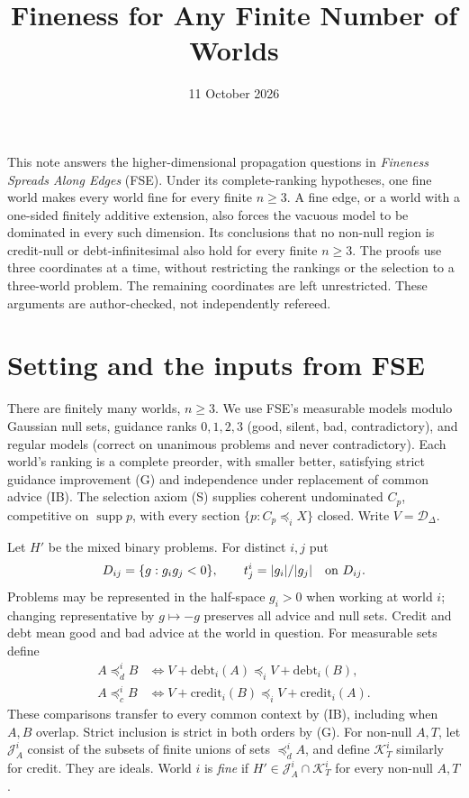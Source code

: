 \documentclass[11pt]{article}
\title{Fineness for Any Finite Number of Worlds}
\author{}\date{11 October 2026}
\theoremstyle{remark}\newtheorem{remark}[theorem]{Remark}
\newcommand{\Dscr}{\mathcal D}
\newcommand{\cred}{\mathrm{credit}}
\newcommand{\debt}{\mathrm{debt}}
\newcommand{\J}{\mathcal J}
\newcommand{\K}{\mathcal K}
\begin{document}
\maketitle

\noindent
This note answers the higher-dimensional propagation questions in
\emph{Fineness Spreads Along Edges} (FSE). Under its complete-ranking
hypotheses, one fine world makes every world fine for every finite
$n\ge3$. A fine edge, or a world with a one-sided finitely additive
extension, also forces the vacuous model to be dominated in every such
dimension. Its conclusions that no non-null region is credit-null or
debt-infinitesimal also hold for every finite $n\ge3$.
The proofs use three coordinates at a time, without restricting the
rankings or the selection to a three-world problem. The remaining
coordinates are left unrestricted. These arguments are author-checked,
not independently refereed.

\section{Setting and the inputs from FSE}

There are finitely many worlds, $n\ge3$. We use FSE's measurable models
modulo Gaussian null sets, guidance ranks $0,1,2,3$ (good, silent, bad,
contradictory), and regular models (correct on unanimous problems and
never contradictory). Each world's ranking is a complete preorder,
with smaller better, satisfying strict guidance improvement (G) and
independence under replacement of common advice (IB).
The selection axiom (S) supplies coherent undominated $C_p$, competitive
on $\operatorname{supp}p$, with every section
$\{p:C_p\preceq_iX\}$ closed. Write $V=\Dscr_\Delta$.

Let $H'$ be the mixed binary problems. For distinct $i,j$ put
\[
 D_{ij}=\{g:g_ig_j<0\},\qquad t^i_j=|g_i|/|g_j|\quad\hbox{on }D_{ij}.
\]
Problems may be represented in the half-space $g_i>0$ when working at
world $i$; changing representative by $g\mapsto-g$ preserves all advice
and null sets. Credit and debt mean good and bad advice at the world in
question. For measurable sets define
\begin{align*}
 A\preceq^i_dB&\iff V+\debt_i(A)\preceq_iV+\debt_i(B),\\
 A\preceq^i_cB&\iff V+\cred_i(B)\preceq_iV+\cred_i(A).
\end{align*}
These comparisons transfer to every common context by (IB), including
when $A,B$ overlap. Strict inclusion is strict in both orders by (G).
For non-null $A,T$, let $\J^i_A$ consist of the subsets of finite unions
of sets $\preceq^i_d A$, and define $\K^i_T$ similarly for credit.
They are ideals. World $i$ is \emph{fine} if $H'\in\J^i_A\cap\K^i_T$
for every non-null $A,T$.
\end{document}
